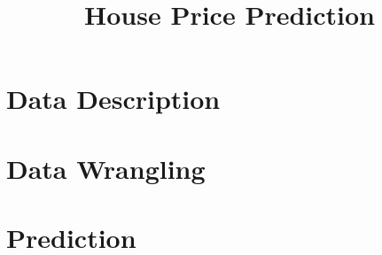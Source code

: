 \documentclass[]{report}
\title{House Price Prediction}
\author{}
\begin{document}
\maketitle



\section*{Data Description}

\section{Data Wrangling}

\section{Prediction}
\end{document}
